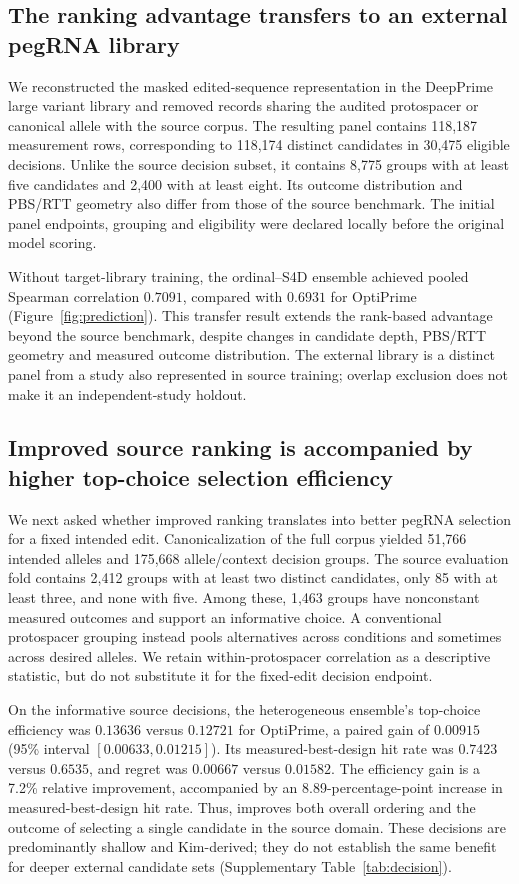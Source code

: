 \subsection{The ranking advantage transfers to an external pegRNA library}
We reconstructed the masked edited-sequence representation in the DeepPrime large variant library and removed records sharing the audited protospacer or canonical allele with the source corpus. The resulting panel contains 118,187 measurement rows, corresponding to 118,174 distinct candidates in 30,475 eligible decisions. Unlike the source decision subset, it contains 8,775 groups with at least five candidates and 2,400 with at least eight. Its outcome distribution and PBS/RTT geometry also differ from those of the source benchmark. The initial panel endpoints, grouping and eligibility were declared locally before the original model scoring.


Without target-library training, the ordinal--S4D ensemble achieved pooled Spearman correlation $0.7091$, compared with $0.6931$ for OptiPrime (Figure~\ref{fig:prediction}). This transfer result extends the rank-based advantage beyond the source benchmark, despite changes in candidate depth, PBS/RTT geometry and measured outcome distribution. The external library is a distinct panel from a study also represented in source training; overlap exclusion does not make it an independent-study holdout.

\subsection{Improved source ranking is accompanied by higher top-choice selection efficiency}
We next asked whether improved ranking translates into better pegRNA selection for a fixed intended edit. Canonicalization of the full corpus yielded 51,766 intended alleles and 175,668 allele/context decision groups. The source evaluation fold contains 2,412 groups with at least two distinct candidates, only 85 with at least three, and none with five. Among these, 1,463 groups have nonconstant measured outcomes and support an informative choice. A conventional protospacer grouping instead pools alternatives across conditions and sometimes across desired alleles. We retain within-protospacer correlation as a descriptive statistic, but do not substitute it for the fixed-edit decision endpoint.

On the informative source decisions, the heterogeneous ensemble's top-choice efficiency was $0.13636$ versus $0.12721$ for OptiPrime, a paired gain of $0.00915$ (95\% interval $[0.00633,0.01215]$). Its measured-best-design hit rate was $0.7423$ versus $0.6535$, and regret was $0.00667$ versus $0.01582$. The efficiency gain is a 7.2\% relative improvement, accompanied by an 8.89-percentage-point increase in measured-best-design hit rate. Thus, \model{} improves both overall ordering and the outcome of selecting a single candidate in the source domain. These decisions are predominantly shallow and Kim-derived; they do not establish the same benefit for deeper external candidate sets (Supplementary Table~\ref{tab:decision}).


